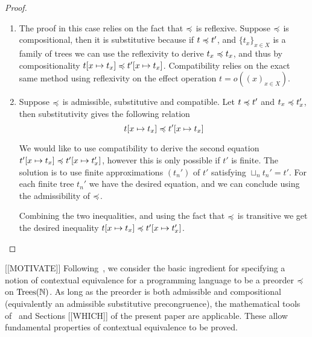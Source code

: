 \noindent
{}
\begin{proof}
    \begin{enumerate}
        \item 
            The proof in this case relies on the fact that $\preccurlyeq$ is reflexive.
            Suppose $\preccurlyeq$ is compositional, then 
            it is substitutive because if $t \preccurlyeq t'$, and $\{ t_x \}_{x
            \in X}$ is a family of trees we can use the reflexivity to derive 
            $t_x \preccurlyeq t_x$, and thus 
            by compositionality $t[ x \mapsto t_x] \preccurlyeq t'[x \mapsto t_x]$.
            Compatibility relies on the exact same method using reflexivity on 
            the effect operation $t = o((x)_{x \in X})$.

        \item 
            Suppose $\preccurlyeq$ is admissible, substitutive and compatible. 
            Let $t \preccurlyeq t'$ and $t_x \preccurlyeq t_x'$, then substitutivity 
            gives the following relation 
            \begin{equation}
                t[x \mapsto t_x] \preccurlyeq t'[x \mapsto t_x]
            \end{equation}

            We would like to use compatibility to derive 
            the second equation $t'[x \mapsto t_x] \preccurlyeq t'[x \mapsto
            t_x']$, however this is only possible if $t'$ is finite. 
            The solution is to use finite approximations $(t_n')$ of $t'$
            satisfying $\sqcup_n t_n' = t'$. For each finite tree $t_n'$
            we have the desired equation, and we can conclude using 
            the admissibility of $\preccurlyeq$.

            Combining the two inequalities, and using the fact that 
            $\preccurlyeq$ is transitive we get the desired inequality
            $t[x \mapsto t_x] \preccurlyeq t'[x \mapsto t_x']$.
    \end{enumerate}
\end{proof}



[[MOTIVATE]]
Following~\cite{gom}, we consider the basic ingredient for specifying  a notion of
contextual equivalence for a programming language to be a preorder $\preccurlyeq$ on $\textnormal{Trees}(\mathbb{N})$.
As long as the preorder is both admissible and compositional (equivalently an admissible substitutive precongruence), the mathematical tools of~\cite{gom} and Sections [[WHICH]] of the present paper are applicable. These allow fundamental properties of contextual equivalence to be proved.

